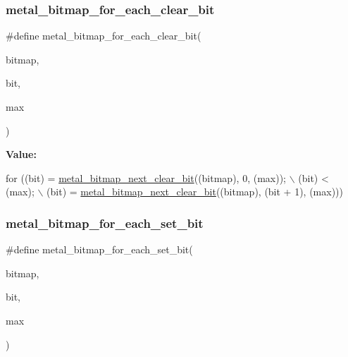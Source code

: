 \mbox{\label{group__utilities_gac301167f066509c8713f452bd05d70d3}} 
\subsubsection{\texorpdfstring{metal\+\_\+bitmap\+\_\+for\+\_\+each\+\_\+clear\+\_\+bit}{metal\_bitmap\_for\_each\_clear\_bit}}
{\footnotesize\ttfamily \#define metal\+\_\+bitmap\+\_\+for\+\_\+each\+\_\+clear\+\_\+bit(\begin{DoxyParamCaption}\item[{}]{bitmap,  }\item[{}]{bit,  }\item[{}]{max }\end{DoxyParamCaption})}

{\bfseries Value\+:}
\begin{DoxyCode}
\textcolor{keywordflow}{for} ((bit) = \hyperlink{group__utilities_gadc1fed2eca21c2c0435feca5a734f816}{metal\_bitmap\_next\_clear\_bit}((bitmap), 0, (max));        \(\backslash\)
             (bit) < (max);                                             \(\backslash\)
             (bit) = \hyperlink{group__utilities_gadc1fed2eca21c2c0435feca5a734f816}{metal\_bitmap\_next\_clear\_bit}((bitmap), (bit + 1), (max)))
\end{DoxyCode}
\mbox{\label{group__utilities_gae9b3f29572249c108220c4b4aecf55a3}} 
\subsubsection{\texorpdfstring{metal\+\_\+bitmap\+\_\+for\+\_\+each\+\_\+set\+\_\+bit}{metal\_bitmap\_for\_each\_set\_bit}}
{\footnotesize\ttfamily \#define metal\+\_\+bitmap\+\_\+for\+\_\+each\+\_\+set\+\_\+bit(\begin{DoxyParamCaption}\item[{}]{bitmap,  }\item[{}]{bit,  }\item[{}]{max }\end{DoxyParamCaption})}

